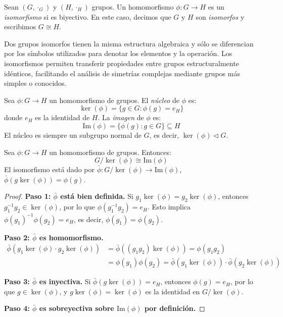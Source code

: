 \begin{definition}\label{def:isomorfismo_grupos}
Sean $(G, \cdot_G)$ y $(H, \cdot_H)$ grupos. Un homomorfismo $\phi: G \rightarrow H$ es un \textit{isomorfismo} si es biyectivo. En este caso, decimos que $G$ y $H$ son \textit{isomorfos} y escribimos $G \cong H$.
\end{definition}

Dos grupos isomorfos tienen la misma estructura algebraica y sólo se diferencian por los símbolos utilizados para denotar los elementos y la operación. Los isomorfismos permiten transferir propiedades entre grupos estructuralmente idénticos, facilitando el análisis de simetrías complejas mediante grupos más simples o conocidos.

\begin{definition}\label{def:nucleo_imagen}
Sea $\phi: G \rightarrow H$ un homomorfismo de grupos. El \textit{núcleo} de $\phi$ es:
\begin{equation}
\ker(\phi) = \{g \in G : \phi(g) = e_H\}
\end{equation}
donde $e_H$ es la identidad de $H$. La \textit{imagen} de $\phi$ es:
\begin{equation}
\mathrm{Im}(\phi) = \{\phi(g) : g \in G\} \subseteq H
\end{equation}
El núcleo es siempre un subgrupo normal de $G$, es decir, $\ker(\phi) \triangleleft G$.
\end{definition}

\begin{theorem}\label{thm:primer_isomorfismo}
Sea $\phi: G \rightarrow H$ un homomorfismo de grupos. Entonces:
\begin{equation}
G/\ker(\phi) \cong \mathrm{Im}(\phi)
\end{equation}
El isomorfismo está dado por $\bar{\phi}: G/\ker(\phi) \rightarrow \mathrm{Im}(\phi)$, $\bar{\phi}(g\ker(\phi)) = \phi(g)$.
\end{theorem}

\begin{proof}
\textbf{Paso 1: $\bar{\phi}$ está bien definida.} Si $g_1\ker(\phi) = g_2\ker(\phi)$, entonces $g_1^{-1}g_2 \in \ker(\phi)$, por lo que $\phi(g_1^{-1}g_2) = e_H$. Esto implica $\phi(g_1)^{-1}\phi(g_2) = e_H$, es decir, $\phi(g_1) = \phi(g_2)$.

\textbf{Paso 2: $\bar{\phi}$ es homomorfismo.}
\begin{align*}
\bar{\phi}(g_1\ker(\phi) \cdot g_2\ker(\phi)) &= \bar{\phi}((g_1g_2)\ker(\phi)) = \phi(g_1g_2) \\
&= \phi(g_1)\phi(g_2) = \bar{\phi}(g_1\ker(\phi)) \cdot \bar{\phi}(g_2\ker(\phi))
\end{align*}

\textbf{Paso 3: $\bar{\phi}$ es inyectiva.} Si $\bar{\phi}(g\ker(\phi)) = e_H$, entonces $\phi(g) = e_H$, por lo que $g \in \ker(\phi)$, y $g\ker(\phi) = \ker(\phi)$ es la identidad en $G/\ker(\phi)$.

\textbf{Paso 4: $\bar{\phi}$ es sobreyectiva sobre $\mathrm{Im}(\phi)$ por definición.}
\end{proof}

